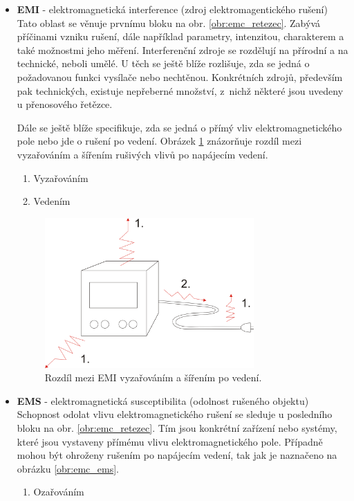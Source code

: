\begin{itemize}
\item {\bf EMI} - elektromagnetická interference (zdroj elektromagentického rušení) \\
Tato oblast se věnuje prvnímu bloku na obr. \ref{obr:emc_retezec}. Zabývá příčinami vzniku rušení, dále například parametry, intenzitou, charakterem a také možnostmi jeho měření. Interferenční zdroje se rozdělují na přírodní a na technické, neboli umělé. U těch se ještě blíže rozlišuje, zda se jedná o požadovanou funkci vysílače nebo nechtěnou. Konkrétních zdrojů, především pak technických, existuje nepřeberné množství, z~nichž některé jsou uvedeny u přenosového řetězce.

Dále se ještě blíže specifikuje, zda se jedná o přímý vliv elektromagnetického pole nebo jde o rušení po vedení. Obrázek \ref{obr:emc_emi} znázorňuje rozdíl mezi vyzařováním a šířením rušivých vlivů po napájecím vedení.
	\begin{enumerate}
	\item Vyzařováním
	\item Vedením
	\end{enumerate}
	\begin{figure}[!h]
	\centering
	\includegraphics[width=8cm]{emc_emi.png}
	\caption{Rozdíl mezi EMI vyzařováním a šířením po vedení.}
	\label{obr:emc_emi}
	\end{figure}
\item {\bf EMS} - elektromagnetická susceptibilita (odolnost rušeného objektu) \\
Schopnost odolat vlivu elektromagnetického rušení se sleduje u posledního bloku na obr. \ref{obr:emc_retezec}. Tím jsou konkrétní zařízení nebo systémy, které jsou vystaveny přímému vlivu elektromagnetického pole. Případně mohou být ohroženy rušením po napájecím vedení, tak jak je naznačeno na obrázku \ref{obr:emc_ems}.
	\begin{enumerate}
	\item Ozařováním

\end{enumerate}
\end{itemize}
